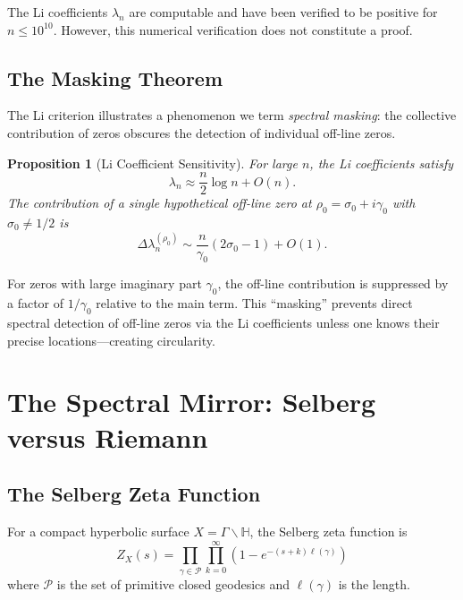\documentclass[12pt, a4paper]{article}
\newtheorem{proposition}[theorem]{Proposition}
\theoremstyle{definition}
\begin{document}
The Li coefficients $\lambda_n$ are computable and have been verified to be positive for $n \leq 10^{10}$. However, this numerical verification does not constitute a proof.

\subsection{The Masking Theorem}

The Li criterion illustrates a phenomenon we term \textit{spectral masking}: the collective contribution of zeros obscures the detection of individual off-line zeros.

\begin{proposition}[Li Coefficient Sensitivity]
For large $n$, the Li coefficients satisfy
\begin{equation}
\lambda_n \approx \frac{n}{2} \log n + O(n).
\end{equation}
The contribution of a single hypothetical off-line zero at $\rho_0 = \sigma_0 + i\gamma_0$ with $\sigma_0 \neq 1/2$ is
\begin{equation}
\Delta \lambda_n^{(\rho_0)} \sim \frac{n}{\gamma_0} (2\sigma_0 - 1) + O(1).
\end{equation}
\end{proposition}

For zeros with large imaginary part $\gamma_0$, the off-line contribution is suppressed by a factor of $1/\gamma_0$ relative to the main term. This ``masking'' prevents direct spectral detection of off-line zeros via the Li coefficients unless one knows their precise locations---creating circularity.

\section{The Spectral Mirror: Selberg versus Riemann}

\subsection{The Selberg Zeta Function}

For a compact hyperbolic surface $X = \Gamma \backslash \mathbb{H}$, the Selberg zeta function is
\begin{equation}
Z_X(s) = \prod_{\gamma \in \mathcal{P}} \prod_{k=0}^{\infty} \left(1 - e^{-(s+k)\ell(\gamma)}\right)
\end{equation}
where $\mathcal{P}$ is the set of primitive closed geodesics and $\ell(\gamma)$ is the length.
\end{document}
